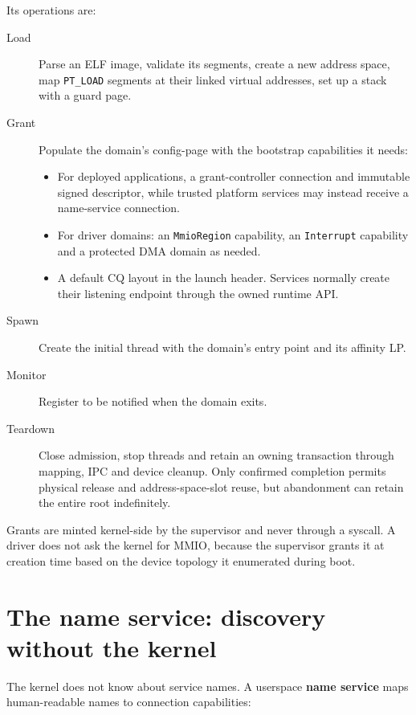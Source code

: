 Its operations are:

\begin{description}
    \item[Load] Parse an ELF image, validate its segments, create a
        new address space, map \texttt{PT\_LOAD} segments at their linked
        virtual addresses, set up a stack with a guard page.
    \item[Grant] Populate the domain's config-page with the bootstrap
        capabilities it needs:
        \begin{itemize}
            \item For deployed applications, a grant-controller connection
                and immutable signed descriptor, while trusted platform services may
                instead receive a name-service connection.
            \item For driver domains: an \texttt{MmioRegion} capability, an
                \texttt{Interrupt} capability and a protected DMA domain as needed.
            \item A default CQ layout in the launch header. Services normally
                create their listening endpoint through the owned runtime API.
        \end{itemize}
    \item[Spawn] Create the initial thread with the domain's entry
        point and its affinity LP.
    \item[Monitor] Register to be notified when the domain exits.
    \item[Teardown] Close admission, stop threads and retain an owning transaction
        through mapping, IPC and device cleanup. Only confirmed completion
        permits physical release and address-space-slot reuse, but abandonment can
        retain the entire root indefinitely.
\end{description}

Grants are minted kernel-side by the supervisor and never through a syscall. A
driver does not ask the kernel for MMIO, because the supervisor grants it at creation
time based on the device topology it enumerated during boot.

\section{The name service: discovery without the kernel}

The kernel does not know about service names. A userspace \textbf{name service}
maps human-readable names to connection capabilities:


